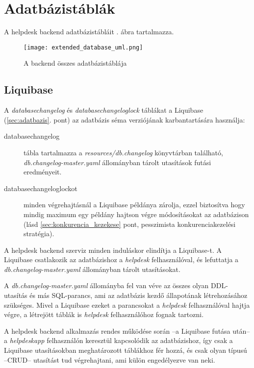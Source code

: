 \section{Adatbázistáblák}
A helpdesk backend adatbázistábláit . ábra tartalmazza.

\begin{figure}[hbt] 
	\centering
	\texttt{[image: extended\_database\_uml.png]}
	\caption{A backend összes adatbázistáblája}
	\label{fig:extended_database_uml}
\end{figure}


\subsection{Liquibase}\label{sec:liquibase}
A \textit{databasechangelog} és \textit{databasechangeloglock} táblákat a Liquibase (\ref{sec:adatbazis}. pont) az adatbázis séma verziójának karbantartására használja:
\begin{description}
	\item[databasechangelog] tábla tartalmazza a \mbox{\textit{resources/db.changelog}} könyvtárban található,  \mbox{\textit{db.changelog-master.yaml}} állományban tárolt utasítások futási eredményeit.
	
	\item[databasechangeloglockot] minden végrehajtásnál a Liquibase példánya  zárolja, ezzel biztosítva hogy mindig maximum egy példány hajtson végre módosításokat az adatbázison (lásd \ref{sec:konkurencia_kezekese} pont, pesszimista konkurenciakezelési stratégia).
\end{description}

A helpdesk backend szerviz minden induláskor elindítja a Liquibase-t. A Liquibase csatlakozik az adatbázishoz a \textit{helpdesk} felhasználóval, és lefuttatja a \mbox{\textit{db.changelog-master.yaml}} állományban tárolt utasításokat.

A \mbox{\textit{db.changelog-master.yaml}} állományba fel van véve az összes olyan DDL-utasítás és más SQL-parancs, ami az adatbázis kezdő állapotának létrehozásához szükséges. Mivel a Liquibase ezeket a parancsokat a \textit{helpdesk} felhasználóval hajtja végre, a létrejött táblák is \textit{helpdesk} felhasználóhoz fognak tartozni. 

A helpdesk backend alkalmazás rendes működése során --a Liquibase futása után-- a \textit{helpdesk\textunderscore app} felhasználón keresztül kapcsolódik az adatbázishoz, így csak a Liquibase utasításokban meghatározott táblákhoz fér hozzá, és csak olyan típusú --CRUD-- utasítást tud végrehajtani, ami külön engedélyezve van neki.


